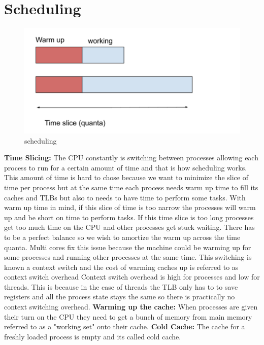 \documentclass[twoside]{article}
\begin{document}
\section{Scheduling}
\begin{figure}[h!]
  \includegraphics[width=\linewidth]{fig9.png}
  \caption{scheduling}
  \label{fig:fig9}
\end{figure}
\textbf{Time Slicing:} The CPU constantly is switching between processes allowing each process to run for a certain amount of time and that is how scheduling works.
\newline
This amount of time is hard to chose because we want to minimize the slice of time per process but at the same time each process needs warm up time to fill its caches and TLBs but also to needs to have time to perform some tasks. With warm up time in mind, if this slice of time is too narrow the processes will warm up and be short on time to perform tasks. If this time slice is too long processes get too much time on the CPU and other processes get stuck waiting. There has to be a perfect balance so we wish to amortize the warm up across the time quanta. Multi cores fix this issue because the machine could be warming up for some processes and running other processes at the same time. 
\newline
This switching is known a context switch and the cost of warming caches up is referred to as context switch overhead
\newline
Context switch overhead is  high for processes and low for threads. This is because in the case of threads the TLB only has to to save registers and all the process state stays the same so there is practically no context switching overhead. 
\newline
\textbf{Warming up the cache:} When processes are given their turn on the CPU they need to get a bunch of memory from main memory referred to as a "working set" onto their cache. 
\newline
\textbf{Cold Cache:} The cache for a freshly loaded process is empty and its called cold cache.
\end{document}
